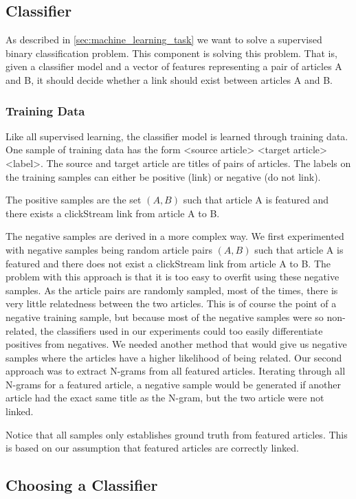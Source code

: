 \subsection{Classifier}
As described in \cref{sec:machine_learning_task} we want to solve a supervised binary classification problem. This component is solving this problem. That is, given a classifier model and a vector of features representing a pair of articles A and B, it should decide whether a link should exist between articles A and B.

\subsubsection{Training Data}
Like all supervised learning, the classifier model is learned through training data. One sample of training data has the form <source article> <target article> <label>. The source and target article are titles of pairs of articles. The labels on the training samples can either be positive (link) or negative (do not link).

The positive samples are the set $(A,B)$ such that article A is featured and there exists a clickStream link from article A to B.

The negative samples are derived in a more complex way. We first experimented with negative samples being random article pairs $(A,B)$ such that article A is featured and there does not exist a clickStream link from article A to B. The problem with this approach is that it is too easy to overfit using these negative samples. As the article pairs are randomly sampled, most of the times, there is very little relatedness between the two articles. This is of course the point of a negative training sample, but because most of the negative samples were so non-related, the classifiers used in our experiments could too easily differentiate positives from negatives. We needed another method that would give us negative samples where the articles have a higher likelihood of being related. Our second approach was to extract N-grams from all featured articles. Iterating through all N-grams for a featured article, a negative sample would be generated if another article had the exact same title as the N-gram, but the two article were not linked.

Notice that all samples only establishes ground truth from featured articles. This is based on our assumption that featured articles are correctly linked.

\subsection{Choosing a Classifier}

